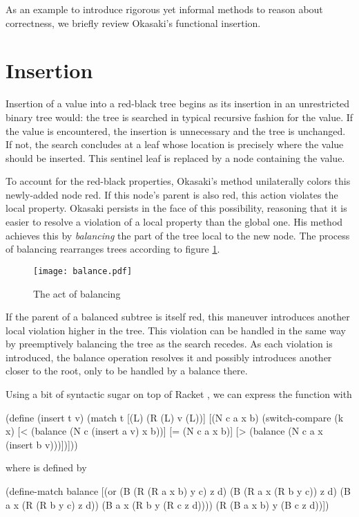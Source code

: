 \documentclass[preprint]{sigplanconf}
\begin{document}
As an example to introduce rigorous yet informal methods to reason about correctness, we briefly review Okasaki's functional insertion.

\section{Insertion}

Insertion of a value into a red-black tree begins as its insertion in an unrestricted binary tree would: the tree is searched in typical recursive fashion for the value. If the value is encountered, the insertion is unnecessary and the tree is unchanged. If not, the search concludes at a leaf whose location is precisely where the value should be inserted. This sentinel leaf is replaced by a node containing the value.

To account for the red-black properties, Okasaki's method unilaterally colors this newly-added node red. If this node's parent is also red, this action violates the local property. Okasaki persists in the face of this possibility, reasoning that it is easier to resolve a violation of a local property than the global one. His method achieves this by \emph{balancing} the part of the tree local to the new node. The process of balancing rearranges trees according to figure \ref{fig:balance}.

\begin{figure}
\label{fig:balance}
\begin{center}
\texttt{[image: balance.pdf]}
\end{center}
\caption{The act of balancing}
\end{figure}

If the parent of a balanced subtree is itself red, this maneuver introduces another local violation higher in the tree. This violation can be handled in the same way by preemptively balancing the tree as the search recedes. As each violation is introduced, the balance operation resolves it and possibly introduces another closer to the root, only to be handled by a balance there. 

Using a bit of syntactic sugar on top of Racket \cite{plt-tr1}, we can express the  function with
\begin{schemedisplay}
(define (insert t v)
  (match t
    [(L) (R (L) v (L))]
    [(N c a x b)
     (switch-compare
       (k x)
       [< (balance (N c (insert a v) x b))]
       [= (N c a x b)]
       [> (balance (N c a x (insert b v)))])]))
\end{schemedisplay}
where  is defined by
\begin{schemedisplay}
(define-match balance
  [(or (B (R (R a x b) y c) z d)
       (B (R a x (R b y c)) z d)
       (B a x (R (R b y c) z d))
       (B a x (R b y (R c z d))))
   (R (B a x b) y (B c z d))])
\end{schemedisplay}
\end{document}
